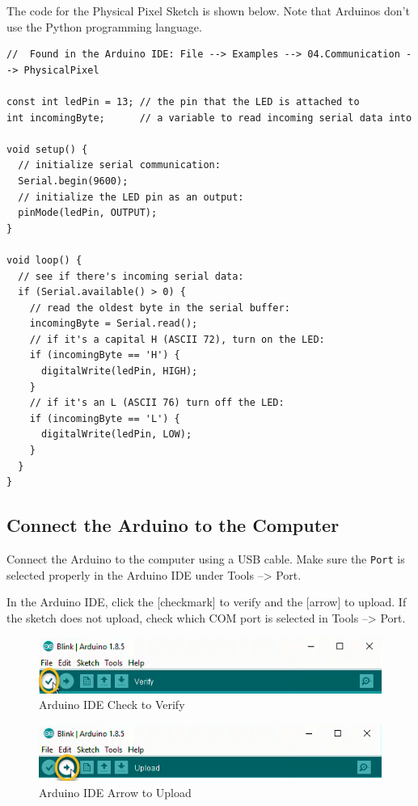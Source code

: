 \documentclass{book}
\makeatletter
\def\maxwidth{\ifdim\Gin@nat@width>\linewidth\linewidth
    \else\Gin@nat@width\fi}
\let\Oldincludegraphics\includegraphics
\renewcommand{\includegraphics}[1]{\Oldincludegraphics[width=.8\maxwidth]{#1}}
\makeatother
\begin{document}
The code for the Physical Pixel Sketch is shown below. Note that
Arduinos don't use the Python programming language.

    \begin{lstlisting}
//  Found in the Arduino IDE: File --> Examples --> 04.Communication --> PhysicalPixel

const int ledPin = 13; // the pin that the LED is attached to
int incomingByte;      // a variable to read incoming serial data into

void setup() {
  // initialize serial communication:
  Serial.begin(9600);
  // initialize the LED pin as an output:
  pinMode(ledPin, OUTPUT);
}

void loop() {
  // see if there's incoming serial data:
  if (Serial.available() > 0) {
    // read the oldest byte in the serial buffer:
    incomingByte = Serial.read();
    // if it's a capital H (ASCII 72), turn on the LED:
    if (incomingByte == 'H') {
      digitalWrite(ledPin, HIGH);
    }
    // if it's an L (ASCII 76) turn off the LED:
    if (incomingByte == 'L') {
      digitalWrite(ledPin, LOW);
    }
  }
}
\end{lstlisting}

    \subsection{Connect the Arduino to the
Computer}\label{connect-the-arduino-to-the-computer}

    Connect the Arduino to the computer using a USB cable. Make sure the
\lstinline!Port! is selected properly in the Arduino IDE under Tools
--\textgreater{} Port.

In the Arduino IDE, click the {[}checkmark{]} to verify and the
{[}arrow{]} to upload. If the sketch does not upload, check which COM
port is selected in Tools --\textgreater{} Port.

\begin{figure}
\centering
\includegraphics{images/Check_to_Verify.png}
\caption{Arduino IDE Check to Verify}
\end{figure}

\begin{figure}
\centering
\includegraphics{images/Arrow_to_Upload.png}
\caption{Arduino IDE Arrow to Upload}
\end{figure}
\end{document}
